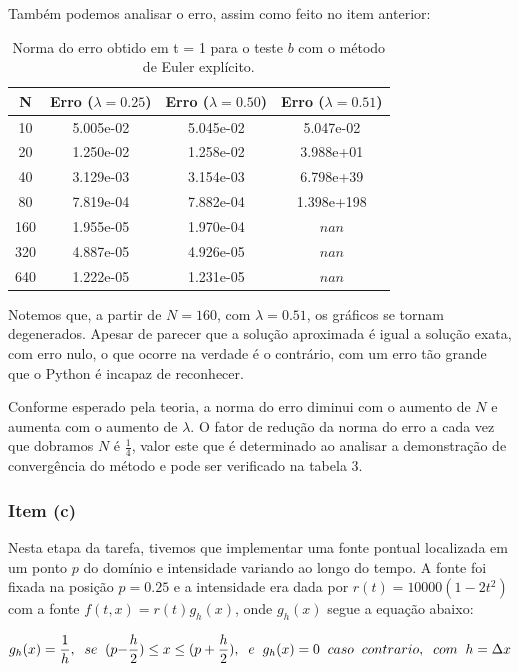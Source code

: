 \documentclass[a4paper, 12pt]{article}
\begin{document}
Também podemos analisar o erro, assim como feito no item anterior: 

\begin{table}[!h]
    \centering
    \begin{tabular}{|c|c|c|c|}
    \hline                               %
    N & Erro ($\lambda = 0.25$) & Erro ($\lambda = 0.50$) & Erro ($\lambda = 0.51$) \\
    \hline
    10  & 5.005e-02  & 5.045e-02 & 5.047e-02   \\
    20  & 1.250e-02  & 1.258e-02 & 3.988e+01   \\
    40  & 3.129e-03  & 3.154e-03 & 6.798e+39  \\
    80  & 7.819e-04  & 7.882e-04 & 1.398e+198 \\
    160 & 1.955e-05  & 1.970e-04 &  $nan$ \\
    320 & 4.887e-05  & 4.926e-05 &  $nan$ \\
    640 & 1.222e-05  & 1.231e-05 &  $nan$ \\
    \hline
    \end{tabular}
    \caption{Norma do erro obtido em t = 1 para o teste $b$ com o método de Euler explícito.}
\end{table}

Notemos que, a partir de $N=160$, com $\lambda=0.51$, os gráficos se tornam degenerados. Apesar de parecer que a solução aproximada é igual a solução exata, com erro nulo, o que ocorre na verdade é o contrário, com um erro tão grande que o Python é incapaz de reconhecer.

Conforme esperado pela teoria, a norma do erro diminui com o aumento de $N$ e aumenta com o aumento de $\lambda$. O fator de redução da norma do erro a cada vez que dobramos $N$ é $\frac{1}{4}$, valor este que é determinado ao analisar a demonstração de convergência do método e pode ser verificado na tabela 3. 

\subsubsection{Item (c)}
Nesta etapa da tarefa, tivemos que implementar uma fonte pontual localizada em um ponto $p$ do domínio e intensidade variando ao longo do tempo. A fonte foi fixada na posição $p=0.25$ e a intensidade era dada por $r(t) = 10000({1 - 2t^2})$ com a fonte $f(t, x) = r(t)g_{h}(x)$, onde $g_{h}(x)$ segue a equação abaixo:


\begin{eqnarray}
g_{h}(x) =\frac{1}{h}, \hspace{0.2cm} se \hspace{0.2cm} (p {-}\frac{h}{2}) \leq  x \leq (p + \frac{h}{2}),\hspace{0.2cm} e \hspace{0.2cm} g_{h}(x) = 0 \hspace{0.2cm} caso\hspace{0.2cm} contrario, \hspace{0.2cm} com \hspace{0.2cm} h = \Delta x
\label{eqn:ghx}
\end{eqnarray}
\end{document}
